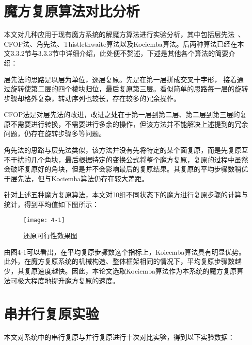 \section{魔方复原算法对比分析}

本文对几种应用于现有魔方系统的解魔方算法进行实验分析，其中包括层先法~\cite{39}、CFOP法、角先法、Thistlethwaite算法以及Kociemba算法。后两种算法已经在本文3.3.2节与3.3.3节中详细介绍，此处便不赘述，下述是其他各个算法的简要介绍：

层先法的思路是以层为单位，逐层复原。先是在第一层拼成交叉十字形， 接着通过旋转使第二层的四个棱块归位，最后复原第三层。看似简单的思路每一层的旋转步骤却格外复杂，转动序列也较长，存在较多的冗余操作。

CFOP法是对层先法的改进，改进之处在于第一层到第二层、第二层到第三层的复原不需要进行转换，不需要进行多余的操作，但该方法并不能解决上述提到的冗余问题，仍存在旋转步骤多等问题。

角先法的思路与层先法类似，该方法并没有先将特定的某个面复原，而是先复原互不干扰的几个角块，最后根据特定的变换公式将整个魔方复原，复原的过程中虽然会破坏复原好的角块，但是并不会影响最后的复原结果。其复原的平均步骤数稍优于层先法，但与Kociemba算法仍存在较大差距。

针对上述五种魔方复原算法，本文对10组不同状态下的魔方进行复原步骤的计算与统计，得到平均值如下图所示：

\begin{figure}[H]
	\centering
	\texttt{[image: 4-1]}
	\caption{还原可行性效果图}\label{fig:4-1}
\end{figure}

由图4-1可以看出，在平均复原步骤数这个指标上，Koicemba算法具有明显优势。此外，在魔方复原系统的机械构造、整体框架相同的情况下，平均复原步骤数越少，其复原速度越快。因此，本论文选取Kociemba算法作为本系统的魔方复原算法可极大程度地提升魔方复原的速度。

\section{串并行复原实验}

本文对系统中的串行复原与并行复原进行十次对比实验，得到以下实验数据：

